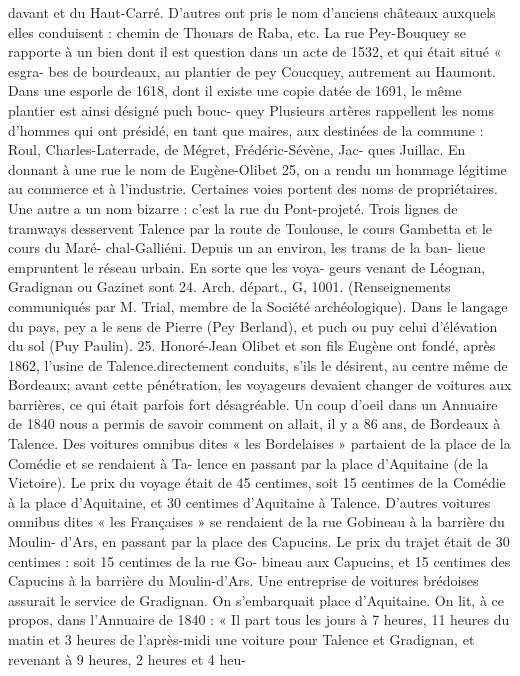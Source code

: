 \documentclass[a4paper,11pt]{book}
\begin{document}
davant et du Haut-Carré. D'autres ont pris le nom d'anciens
châteaux auxquels elles conduisent : chemin de Thouars
de Raba, etc.
La rue Pey-Bouquey se rapporte à un bien dont il est
question dans un acte de 1532, et qui était situé « esgra-
bes de bourdeaux, au plantier de pey Coucquey, autrement
au Haumont.
Dans une esporle de 1618, dont il existe une copie datée
de 1691, le même plantier est ainsi désigné puch bouc-
quey
Plusieurs artères rappellent les noms d'hommes qui ont
présidé, en tant que maires, aux destinées de la commune :
Roul, Charles-Laterrade, de Mégret, Frédéric-Sévène, Jac-
ques Juillac.
En donnant à une rue le nom de Eugène-Olibet 25, on
a rendu un hommage légitime au commerce et à l'industrie.
Certaines voies portent des noms de propriétaires. Une
autre a un nom bizarre : c'est la rue du Pont-projeté.
Trois lignes de tramways desservent Talence par la
route de Toulouse, le cours Gambetta et le cours du Maré-
chal-Galliéni. Depuis un an environ, les trams de la ban-
lieue empruntent le réseau urbain. En sorte que les voya-
geurs venant de Léognan, Gradignan ou Gazinet sont
24. Arch. départ., G, 1001. (Renseignements communiqués par M. Trial,
membre de la Société archéologique).
Dans le langage du pays, pey a le sens de Pierre (Pey Berland), et
puch ou puy celui d'élévation du sol (Puy Paulin).
25. Honoré-Jean Olibet et son fils Eugène ont fondé, après 1862,
l'usine de Talence.directement conduits, s'ils le désirent, au centre même de
Bordeaux; avant cette pénétration, les voyageurs devaient
changer de voitures aux barrières, ce qui était parfois fort
désagréable.
Un coup d'oeil dans un Annuaire de 1840 nous a permis
de savoir comment on allait, il y a 86 ans, de Bordeaux
à Talence. Des voitures omnibus dites « les Bordelaises »
partaient de la place de la Comédie et se rendaient à Ta-
lence en passant par la place d'Aquitaine (de la Victoire).
Le prix du voyage était de 45 centimes, soit 15 centimes
de la Comédie à la place d'Aquitaine, et 30 centimes
d'Aquitaine à Talence.
D'autres voitures omnibus dites « les Françaises » se
rendaient de la rue Gobineau à la barrière du Moulin-
d'Ars, en passant par la place des Capucins. Le prix du
trajet était de 30 centimes : soit 15 centimes de la rue Go-
bineau aux Capucins, et 15 centimes des Capucins à la
barrière du Moulin-d'Ars.
Une entreprise de voitures brédoises assurait le service
de Gradignan. On s'embarquait place d'Aquitaine. On lit,
à ce propos, dans l'Annuaire de 1840 :
« Il part tous les jours à 7 heures, 11 heures du matin
et 3 heures de l'après-midi une voiture pour Talence et
Gradignan, et revenant à 9 heures, 2 heures et 4 heu-
\end{document}
